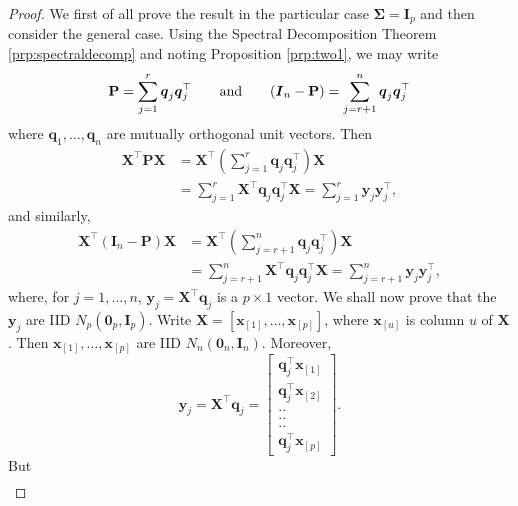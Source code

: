 \documentclass[]{book}
\theoremstyle{definition}
\theoremstyle{definition}
\theoremstyle{definition}
\theoremstyle{remark}
\begin{document}
\begin{proof}
{}We first of all prove the result in the particular case \(\boldsymbol \Sigma= {\mathbf I}_p\) and
then consider the general case. Using the Spectral Decomposition Theorem \ref{prp:spectraldecomp} and noting Proposition \ref{prp:two1}, we may write
\[
{\mathbf P}=\sum_{j=1}^r \boldsymbol q_j \boldsymbol q_j^\top \qquad  \hbox{and} \qquad 
(\boldsymbol I_n-{\mathbf P})=\sum_{j=r+1}^n \boldsymbol q_j \boldsymbol q_j^\top
\]
where \(\boldsymbol q_1, \ldots , \boldsymbol q_n\) are mutually orthogonal unit vectors. Then
\begin{align}
\boldsymbol X^\top \boldsymbol P\boldsymbol X&=  \boldsymbol X^\top \left (\sum_{j=1}^r \boldsymbol q_j \boldsymbol q_j^\top \right) \boldsymbol X\nonumber \\
& =\sum_{j=1}^r \boldsymbol X^\top \boldsymbol q_j \boldsymbol q_j^\top \boldsymbol X=\sum_{j=1}^r \boldsymbol y_j \boldsymbol y_j^\top,
\label{eq:Prep}
\end{align}
and similarly,
\begin{align}
\boldsymbol X^\top (\boldsymbol I_n -\boldsymbol P) \boldsymbol X&=  \boldsymbol X^\top \left (\sum_{j=r+1}^n \boldsymbol q_j \boldsymbol q_j^\top \right) \boldsymbol X\nonumber \\
& =\sum_{j=r+1}^n \boldsymbol X^\top \boldsymbol q_j \boldsymbol q_j^\top \boldsymbol X=\sum_{j=r+1}^n \boldsymbol y_j \boldsymbol y_j^\top,
\label{eq:I-Prep}
\end{align}
where, for \(j=1, \ldots , n\), \(\boldsymbol y_j=\boldsymbol X^\top \boldsymbol q_j\) is a \(p \times 1\) vector. We shall now prove that the \(\boldsymbol y_j\) are
IID \(N_p({\mathbf 0}_p, \boldsymbol I_p)\). Write \(\boldsymbol X=[\boldsymbol x_{[1]}, \ldots , \boldsymbol x_{[p]}]\), where \(\boldsymbol x_{[u]}\) is column \(u\) of
\(\boldsymbol X\). Then \(\boldsymbol x_{[1]}, \ldots , \boldsymbol x_{[p]}\) are IID \(N_n({\mathbf 0}_n ,\boldsymbol I_n)\). Moreover,
\[
\boldsymbol y_j=\boldsymbol X^\top \boldsymbol q_j = \left [  \begin{array}{c}
\boldsymbol q_j^\top \boldsymbol x_{[1]}\\
\boldsymbol q_j^\top \boldsymbol x_{[2]}\\
..\\
..\\
..\\
\boldsymbol q_j^\top \boldsymbol x_{[p]}
\end{array} \right ].
\]
But
\begin{align}

\end{align}
\end{proof}
\end{document}
